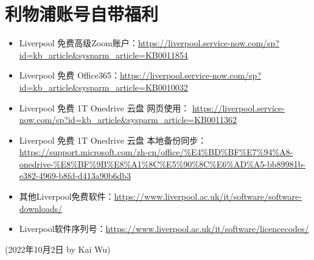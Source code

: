 \section{利物浦账号自带福利}
\begin{itemize}
    \item Liverpool 免费高级Zoom账户：\url{https://liverpool.service-now.com/sp?id=kb_article&sysparm_article=KB0011854}
    \item Liverpool 免费 Office365：\url{https://liverpool.service-now.com/sp?id=kb_article&sysparm_article=KB0010032}
    \item Liverpool 免费 1T Onedrive 云盘 网页使用： \url{https://liverpool.service-now.com/sp?id=kb_article&sysparm_article=KB0011362}
    \item Liverpool 免费 1T Onedrive 云盘 本地备份同步： \url{https://support.microsoft.com/zh-cn/office/%E4%BD%BF%E7%94%A8-onedrive-%E8%BF%9B%E8%A1%8C%E5%90%8C%E6%AD%A5-bb89981b-e382-4969-b8fd-d413a90b6db3}
    \item 其他Liverpool免费软件：\url{https://www.liverpool.ac.uk/it/software/software-downloads/}
    \item Liverpool软件序列号：\url{https://www.liverpool.ac.uk/it/software/licencecodes/}
\end{itemize}

\begin{flushright}
    (2022年10月2日 by Kai Wu)
    \end{flushright}